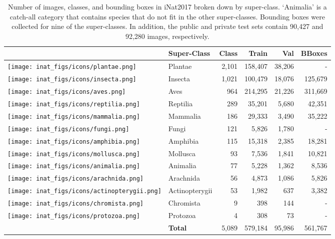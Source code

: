 \documentclass[10pt,twocolumn,letterpaper]{article}
\begin{document}
\begin{table}[t]
\small
\begin{center}
\begin{tabular}{ |>{\centering}m{1.0em}|l|r|r|r|r| }\hline 
& {\bf Super-Class}&{\bf Class}&{\bf Train}&{\bf Val}&{\bf BBoxes}\\\hline
\texttt{[image: inat\_figs/icons/plantae.png]}&Plantae&2,101&158,407&38,206&-\\
\texttt{[image: inat\_figs/icons/insecta.png]}&Insecta&1,021&100,479&18,076&125,679\\
\texttt{[image: inat\_figs/icons/aves.png]}&Aves&964&214,295&21,226&311,669\\
\texttt{[image: inat\_figs/icons/reptilia.png]}&Reptilia&289&35,201&5,680&42,351\\
\texttt{[image: inat\_figs/icons/mammalia.png]}&Mammalia&186&29,333&3,490&35,222\\
\texttt{[image: inat\_figs/icons/fungi.png]}&Fungi&121&5,826&1,780&-\\
\texttt{[image: inat\_figs/icons/amphibia.png]}&Amphibia&115&15,318&2,385&18,281\\
\texttt{[image: inat\_figs/icons/mollusca.png]}&Mollusca&93&7,536&1,841&10,821\\
\texttt{[image: inat\_figs/icons/animalia.png]}&Animalia&77&5,228&1,362&8,536\\
\texttt{[image: inat\_figs/icons/arachnida.png]}&Arachnida&56&4,873&1,086&5,826\\
\texttt{[image: inat\_figs/icons/actinopterygii.png]}&Actinopterygii&53&1,982&637&3,382\\
\texttt{[image: inat\_figs/icons/chromista.png]}&Chromista&9&398&144&-\\
\texttt{[image: inat\_figs/icons/protozoa.png]}&Protozoa&4&308&73&-\\
\hline
& {\bf Total}&5,089&579,184&95,986&561,767\\\hline
\end{tabular}
\end{center}
\caption{Number of images, classes, and bounding boxes in iNat2017 broken down by super-class.
`Animalia' is a catch-all category that contains species that do not fit in the other super-classes.
Bounding boxes were collected for nine of the super-classes. 
In addition, the public and private test sets contain 90,427 and 92,280 images, respectively.}
\label{tab:data_overview}
\end{table}
\end{document}
